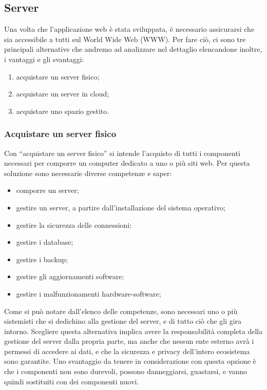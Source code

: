 \documentclass[12pt,a4paper]{article}
\begin{document}
\subsection{Server}

Una volta che l’applicazione web è stata sviluppata, è necessario assicurarsi che sia accessibile a tutti sul World Wide Web (WWW). Per fare ciò, ci sono tre principali alternative che andremo ad analizzare nel dettaglio elencandone inoltre, i vantaggi e gli svantaggi:
\begin{enumerate}
    \item acquistare un server fisico;
    \item acquistare un server in cloud;
    \item acquistare uno spazio gestito.
\end{enumerate}
\subsubsection{Acquistare un server fisico}
Con “acquistare un server fisico” si intende l’acquisto di tutti i componenti necessari per comporre un computer dedicato a uno o più siti web. Per questa soluzione sono necessarie diverse competenze e saper:

\begin{itemize}
    \item comporre un server;
    \item gestire un server, a partire dall’installazione del sistema operativo;
    \item gestire la sicurezza delle connessioni;
    \item gestire i database;
    \item gestire i backup;
    \item gestire gli aggiornamenti software;
    \item gestire i malfunzionamenti hardware-software;
\end{itemize}

Come si può notare dall’elenco delle competenze, sono necessari uno o più sistemisti che si dedichino alla gestione del server, e di tutto ciò che gli gira intorno.
Scegliere questa alternativa implica avere la responsabilità completa della gestione del server dalla propria parte, ma anche che nessun ente esterno avrà i permessi di accedere ai dati, e che la sicurezza e privacy dell’intero ecosistema sono garantite. Uno svantaggio da tenere in considerazione con questa opzione è che i componenti non sono durevoli, possono danneggiarsi, guastarsi, e vanno quindi sostituiti con dei componenti nuovi.
\end{document}
